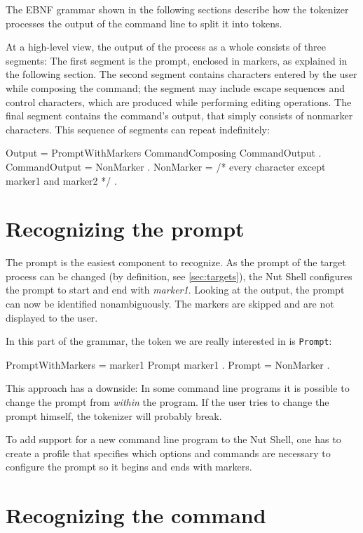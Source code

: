 \documentclass[paper=a4,abstract=on,cleardoublepage=empty,numbers=noenddot,toc=bib,12pt,appendixprefix=true]{scrreprt}
\begin{document}
The \textsc{EBNF} grammar shown in the following sections describe how the tokenizer processes the output of the command line to split it into tokens.

At a high-level view, the output of the process as a whole consists of three segments:
The first segment is the prompt, enclosed in markers, as explained in the following section.
The second segment contains characters entered by the user while composing the command; the segment may include escape sequences and control characters, which are produced while performing editing operations.
The final segment contains the command's output, that simply consists of nonmarker characters.
This sequence of segments can repeat indefinitely:

\begin{ebnf}
Output = { PromptWithMarkers CommandComposing CommandOutput } .
CommandOutput = { NonMarker } .
NonMarker = /* every character except marker1 and marker2 */ .
\end{ebnf}

\section{Recognizing the prompt}

The prompt is the easiest component to recognize. As the prompt of the target process can be changed (by definition, see \cref{sec:targets}), the Nut Shell configures the prompt to start and end with \emph{marker1}. Looking at the output, the prompt can now be identified nonambiguously. The markers are skipped and are not displayed to the user.

In this part of the grammar, the token we are really interested in is \texttt{Prompt}:

\begin{ebnf}
PromptWithMarkers = marker1 Prompt marker1 .
Prompt = { NonMarker } .
\end{ebnf}
%
This approach has a downside: In some command line programs it is possible to change the prompt from \emph{within} the program. If the user tries to change the prompt himself, the tokenizer will probably break.

To add support for a new command line program to the Nut Shell, one has to create a profile that specifies which options and commands are necessary to configure the prompt so it begins and ends with markers.

\section{Recognizing the command}
\label{sec:reccmd}
\end{document}
